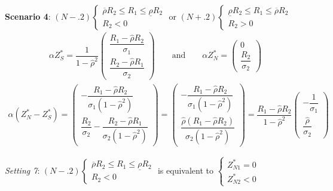 \documentclass[10pt]{article}
\begin{document}
{\bf Scenario 4}: $ (N-.2) \left\{ \begin{matrix} \overline{\rho} R_2 \leqslant R_1 \leqslant \underline{\rho} R_2 \\ R_2 < 0 \end{matrix} \right. $ or $ (N+.2) \left\{ \begin{matrix} \underline{\rho} R_2 \leqslant R_1 \leqslant \overline{\rho} R_2 \\ R_2 > 0 \end{matrix} \right. $
\begin{eqnarray*}
\alpha Z_S^* = \dfrac1{1 - {\hat \rho}^2} \left( \begin{matrix} \dfrac{R_1 - {\hat \rho} R_2}{\sigma_1} \\ \dfrac{R_2 - {\hat \rho} R_1}{\sigma_2} \end{matrix} \right) \qquad \text{and} \qquad \alpha Z_N^* = \left( \begin{matrix} 0 \\ \dfrac{R_2}{\sigma_2} \end{matrix} \right)
\end{eqnarray*}
\begin{eqnarray*}
\alpha (Z_N^* - Z_S^*) = \left( \begin{matrix} - \dfrac{R_1 - {\hat \rho} R_2}{\sigma_1 (1 - {\hat \rho}^2)} \\ \dfrac{R_2}{\sigma_2} - \dfrac{R_2 - {\hat \rho} R_1}{\sigma_2 (1 - {\hat \rho}^2)} \end{matrix} \right) = \left( \begin{matrix} - \dfrac{R_1 - {\hat \rho} R_2}{\sigma_1 (1 - {\hat \rho}^2)} \\ \dfrac{{\hat \rho} (R_1 - {\hat \rho} R_2)}{\sigma_2 (1 - {\hat \rho}^2)} \end{matrix} \right) = \dfrac{R_1 - {\hat \rho} R_2}{1 - {\hat \rho}^2} \left( \begin{matrix} - \dfrac{1}{\sigma_1} \\ \dfrac{{\hat \rho}}{\sigma_2} \end{matrix} \right)
\end{eqnarray*}

{\it Setting 7}: $ (N-.2) \left\{ \begin{matrix} \overline{\rho} R_2 \leqslant R_1 \leqslant \underline{\rho} R_2 \\ R_2 < 0 \end{matrix} \right. $ is equivalent to $ \left\{ \begin{matrix} Z_{N 1}^* = 0 \\ Z_{N 2}^* < 0 \end{matrix} \right. $
\end{document}
